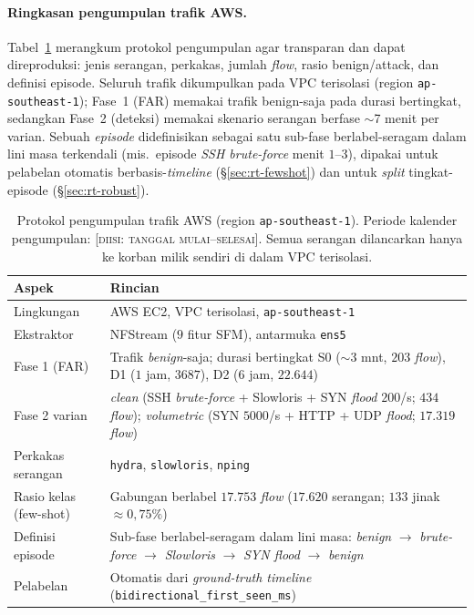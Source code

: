 \documentclass[11pt,a4paper]{article}
\begin{document}
\paragraph{Ringkasan pengumpulan trafik AWS.} Tabel~\ref{tab:awscollect}
merangkum protokol pengumpulan agar transparan dan dapat direproduksi: jenis
serangan, perkakas, jumlah \emph{flow}, rasio benign/attack, dan definisi episode.
Seluruh trafik dikumpulkan pada VPC terisolasi (region \texttt{ap-southeast-1});
Fase~1 (FAR) memakai trafik benign-saja pada durasi bertingkat, sedangkan Fase~2
(deteksi) memakai skenario serangan berfase $\sim$7 menit per varian. Sebuah
\emph{episode} didefinisikan sebagai satu sub-fase berlabel-seragam dalam lini
masa terkendali (mis.\ episode \emph{SSH brute-force} menit $1$--$3$), dipakai untuk
pelabelan otomatis berbasis-\emph{timeline} (\S\ref{sec:rt-fewshot}) dan untuk
\emph{split} tingkat-episode (\S\ref{sec:rt-robust}).

\begin{table}[h]
\centering
\caption{Protokol pengumpulan trafik AWS (region \texttt{ap-southeast-1}). Periode
kalender pengumpulan: \textsc{[diisi: tanggal mulai--selesai]}. Semua serangan
dilancarkan hanya ke korban milik sendiri di dalam VPC terisolasi.}
\label{tab:awscollect}
\small
\begin{tabular}{lp{5.6cm}}
\toprule
Aspek & Rincian \\
\midrule
Lingkungan     & AWS EC2, VPC terisolasi, \texttt{ap-southeast-1} \\
Ekstraktor     & NFStream ($9$ fitur SFM), antarmuka \texttt{ens5} \\
Fase 1 (FAR)   & Trafik \emph{benign}-saja; durasi bertingkat S0 ($\sim$3 mnt, $203$ \emph{flow}), D1 ($1$ jam, $3687$), D2 ($6$ jam, $22{.}644$) \\
Fase 2 varian  & \emph{clean} (SSH \emph{brute-force} + Slowloris + SYN \emph{flood} $200$/s; $434$ \emph{flow}); \emph{volumetric} (SYN $5000$/s + HTTP + UDP \emph{flood}; $17{.}319$ \emph{flow}) \\
Perkakas serangan & \texttt{hydra}, \texttt{slowloris}, \texttt{nping} \\
Rasio kelas (few-shot) & Gabungan berlabel $17{.}753$ \emph{flow} ($17{.}620$ serangan; $133$ jinak $\approx 0{,}75\%$) \\
Definisi episode & Sub-fase berlabel-seragam dalam lini masa: \emph{benign} $\to$ \emph{brute-force} $\to$ \emph{Slowloris} $\to$ \emph{SYN flood} $\to$ \emph{benign} \\
Pelabelan      & Otomatis dari \emph{ground-truth timeline} (\texttt{bidirectional\_first\_seen\_ms}) \\
\bottomrule
\end{tabular}
\end{table}
\end{document}
